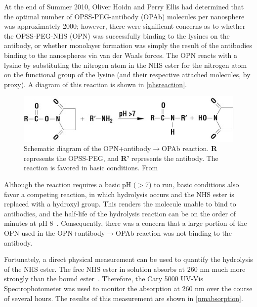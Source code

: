 At the end of Summer 2010, Oliver Hoidn and Perry Ellis had determined that the optimal number of OPSS-PEG-antibody (OPAb) molecules per nanosphere was approximately 2000; however, there were significant concerns as to whether the OPSS-PEG-NHS (OPN) was successfully binding to the lysines on the antibody, or whether monolayer formation was simply the result of the antibodies binding to the nanospheres via van der Waals forces. The OPN reacts with a lysine by substituting the nitrogen atom in the NHS ester for the nitrogen atom on the functional group of the lysine (and their respective attached molecules, by proxy). A diagram of this reaction is shown in \autoref{nhsreaction}.

\begin{figure}[htbp]
\centering
\includegraphics[keepaspectratio,width=\textwidth,height=0.75\textheight]{NHSreaction.jpg}
\caption{Schematic diagram of the OPN+antibody$\to$OPAb reaction. \textbf{R} represents the OPSS-PEG, and \textbf{R'} represents the antibody. The reaction is favored in basic conditions. From ~\citep{nhsreaction}}
\label{nhsreaction}
\end{figure}



Although the reaction requires a basic pH ($>$7) to run, basic conditions also favor a competing reaction, in which hydrolysis occurs and the NHS ester is replaced with a hydroxyl group. This renders the molecule unable to bind to antibodies, and the half-life of the hydrolysis reaction can be on the order of minutes at pH 8~\citep{nhshalflife}. Consequently, there was a concern that a large portion of the OPN used in the OPN+antibody$\to$OPAb reaction was not binding to the antibody.

Fortunately, a direct physical measurement can be used to quantify the hydrolysis of the NHS ester. The free NHS ester in solution absorbs at 260 nm much more strongly than the bound ester~\citep{Miron_Wilchek_1982}. Therefore, the Cary 5000 UV-Vis Spectrophotometer was used to monitor the absorption at 260 nm over the course of several hours. The results of this measurement are shown in \autoref{nmabsorption}.

